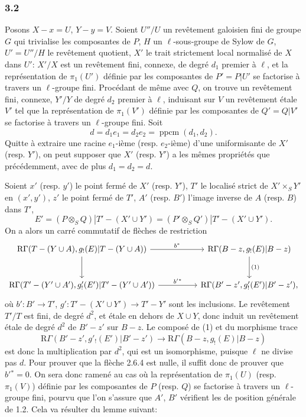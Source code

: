 \subsubsection*{3.2}
Posons $X-x=U$, $Y-y=V$. Soient $U''/U$ un revêtement galoisien fini de groupe $G$ qui trivialise les composantes de $P$, $H$ un $\ell$-sous-groupe de Sylow de $G$, $U'=U''/H$ le revêtement quotient, $X'$ le trait strictement local normalisé de $X$ dans $U'$: $X'/X$ est un revêtement fini, connexe, de degré $d_1$ premier à $\ell$, et la représentation de $\pi_1(U')$ définie par les composantes de $P'=P|U'$ se factorise à travers un $\ell$-groupe fini. Procédant de même avec $Q$, on trouve un revêtement fini, connexe, $Y'/Y$ de degré $d_2$ premier à $\ell$, induisant sur $V$ un revêtement étale $V'$ tel que la représentation de $\pi_1(V')$ définie par les composantes de $Q'=Q|V'$ se factorise à travers un $\ell$-groupe fini. Soit
\[
d=d_1e_1=d_2e_2=\operatorname{ppcm}(d_1,d_2).
\]
Quitte à extraire une racine $e_1$-ième (resp. $e_2$-ième) d'une uniformisante de $X'$ (resp. $Y'$), on peut supposer que $X'$ (resp. $Y'$) a les mêmes propriétés que précédemment, avec de plus $d_1=d_2=d$.

Soient $x'$ (resp. $y'$) le point fermé de $X'$ (resp. $Y'$), $T'$ le localisé strict de $X'\times_S Y'$ en $(x',y')$, $z'$ le point fermé de $T'$, $A'$ (resp. $B'$) l'image inverse de $A$ (resp. $B$) dans $T'$,
\[
E'=(P\otimes_S Q)|T'-(X'\cup Y')
   =(P'\otimes_S Q')|T'-(X'\cup Y').
\]
On a alors un carré commutatif de flèches de restriction
\[
\begin{tikzcd}[column sep=huge,row sep=large]
\mathrm{R}\Gamma(T-(Y\cup A),g_!(E)|T-(Y\cup A))
 \arrow[r,"b^*"] \arrow[d]
&
\mathrm{R}\Gamma(B-z,g_!(E)|B-z) \arrow[d,"(1)"]\\
\mathrm{R}\Gamma(T'-(Y'\cup A'),g'_!(E')|T'-(Y'\cup A'))
 \arrow[r,"b'{}^*"]
&
\mathrm{R}\Gamma(B'-z',g'_!(E')|B'-z') ,
\end{tikzcd}
\]
où $b':B'\to T'$, $g':T'-(X'\cup Y')\to T'-Y'$
sont les inclusions. Le revêtement $T'/T$ est fini, de degré $d^2$, et étale en dehors de $X\cup Y$, donc induit un revêtement étale de degré $d^2$ de $B'-z'$ sur $B-z$. Le composé de (1) et du morphisme trace
\[
\mathrm{R}\Gamma(B'-z',g'_!(E')|B'-z')
 \longrightarrow
\mathrm{R}\Gamma(B-z,g_!(E)|B-z)
\]
est donc la multiplication par $d^2$, qui est un isomorphisme, puisque $\ell$ ne divise pas $d$. Pour prouver que la flèche 2.6.4 est nulle, il suffit donc de prouver que $b'{}^*=0$. On sera donc ramené au cas où la représentation de $\pi_1(U)$ (resp. $\pi_1(V)$) définie par les composantes de $P$ (resp. $Q$) se factorise à travers un $\ell$-groupe fini, pourvu que l'on s'assure que $A'$, $B'$ vérifient les  de position générale de 1.2. Cela va résulter du lemme suivant:

